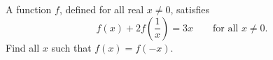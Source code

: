 A function $f$, defined for all real $x\ne0$, satisfies
\[
f(x)+2f\!\left(\dfrac{1}{x}\right)=3x\qquad\text{for all }x\ne0 .
\]
Find all $x$ such that $f(x)=f(-x)$.
